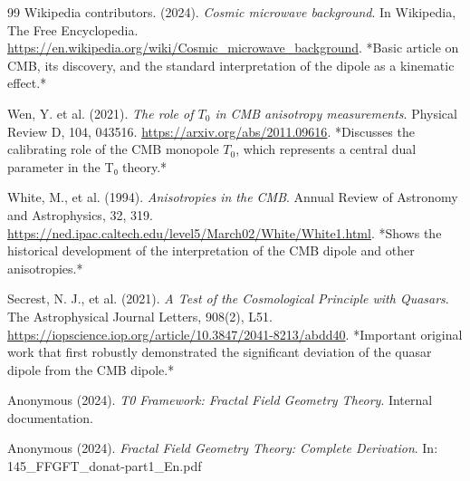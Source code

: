 \begin{thebibliography}{99}
		Wikipedia contributors. (2024). \textit{Cosmic microwave background}. 
		In Wikipedia, The Free Encyclopedia.
		\href{https://en.wikipedia.org/wiki/Cosmic_microwave_background}{https://en.wikipedia.org/wiki/Cosmic\_microwave\_background}.
		*Basic article on CMB, its discovery, and the standard interpretation of the dipole as a kinematic effect.*
		
		Wen, Y. et al. (2021). \textit{The role of \(T_0\) in CMB anisotropy measurements}. 
		Physical Review D, 104, 043516.
		\href{https://arxiv.org/abs/2011.09616}{https://arxiv.org/abs/2011.09616}.
		*Discusses the calibrating role of the CMB monopole \(T_0\), which represents a central dual parameter in the T₀ theory.*
		
		White, M., et al. (1994). \textit{Anisotropies in the CMB}. 
		Annual Review of Astronomy and Astrophysics, 32, 319.
		\href{https://ned.ipac.caltech.edu/level5/March02/White/White1.html}{https://ned.ipac.caltech.edu/level5/March02/White/White1.html}.
		*Shows the historical development of the interpretation of the CMB dipole and other anisotropies.*
		
		Secrest, N. J., et al. (2021). \textit{A Test of the Cosmological Principle with Quasars}. 
		The Astrophysical Journal Letters, 908(2), L51.
		\href{https://iopscience.iop.org/article/10.3847/2041-8213/abdd40}{https://iopscience.iop.org/article/10.3847/2041-8213/abdd40}.
		*Important original work that first robustly demonstrated the significant deviation of the quasar dipole from the CMB dipole.*
		
		Anonymous (2024). \textit{T0 Framework: Fractal Field Geometry Theory}. 
		Internal documentation.
		
		Anonymous (2024). \textit{Fractal Field Geometry Theory: Complete Derivation}. 
		In: 145\_FFGFT\_donat-part1\_En.pdf
		
	\end{thebibliography}
	